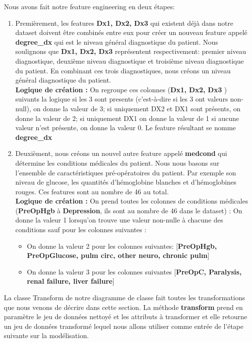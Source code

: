 \documentclass[12pt, french]{report}
\begin{document}
Nous avons fait notre feature engineering en deux étapes: 
\begin{enumerate}
\item Premièrement, les features \textbf{Dx1, Dx2, Dx3 } qui existent déjà dans notre dataset doivent être combinés entre eux pour créer un nouveau feature appelé \textbf{degree\_dx} qui est le niveau général diagnostique du patient. Nous soulignons que  \textbf{Dx1, Dx2, Dx3} représentent respectivement: premier niveau diagnostique, deuxième niveau diagnostique et troisième niveau diagnostique du patient. En combinant ces trois diagnostiques, nous créons un niveau général  diagnostique du patient. \\
\textbf{Logique de création : } On regroupe ces colonnes (\textbf{Dx1, Dx2, Dx3 }) suivants la logique si les 3 sont presents (c'est-à-dire si les 3 ont valeurs non-null), on donne la valeur de 3; si uniquement DX2 et DX1 sont présents, on donne la valeur de 2; si uniquement DX1 on donne la valeur de 1 si aucune valeur n'est présente, on donne la valeur 0. Le feature résultant se nomme  \textbf{degree\_dx}
\item Deuxièment, nous créons un nouvel autre feature appelé \textbf{medcond} qui détermine les conditions médicales du patient. Nous nous basons sur l'ensemble de caractéristiques pré-opératoires du patient. Par exemple son niveau de glucose, les quantités d'hémoglobine blanches et d'hémoglobines rouges. Ces features sont au nombre de 46 au total.\\
\textbf{Logique de création : } On prend toutes les colonnes de conditions médicales (\textbf{PreOpHgb}  à \textbf{Depression}, ils sont au nombre de 46 dans le dataset) : On donne la valeur 1 lorsqu'on trouve une valeur non-nulle à chacune des conditions sauf pour les colonnes suivantes :
\begin{itemize}
\item On donne la valeur 2 pour les colonnes suivantes: [\textbf{PreOpHgb, PreOpGlucose, pulm circ, other neuro, chronic pulm}]
\item On donne la valeur 3 pour les colonnes suivantes [\textbf{PreOpC, Paralysis, renal failure, liver failure}]
\end{itemize}


\end{enumerate}

La classe Transform de notre diagramme de classe fait toutes les transformations que nous venons de décrire dans cette section. La méthode \textbf{transform} prend en paramètre le jeu de données nettoyé et les attributs à transformer et elle retourne un jeu de données transformé lequel nous allons utiliser comme entrée de l'étape suivante sur la modélisation. 
\end{document}
